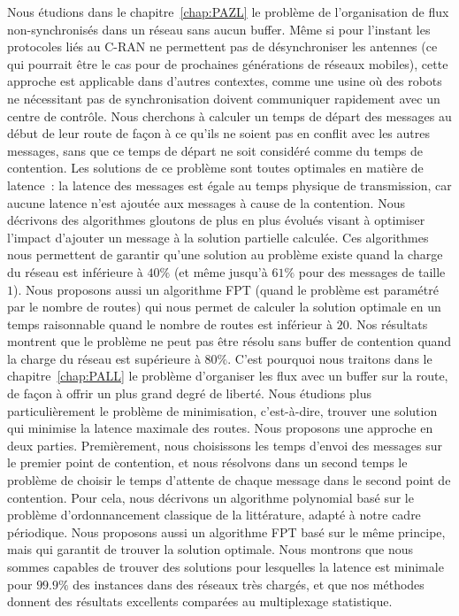 Nous étudions dans le chapitre~\ref{chap:PAZL} le problème de l'organisation de flux non-synchronisés dans un réseau sans aucun buffer.
Même si pour l'instant les protocoles liés au C-RAN ne permettent pas de désynchroniser les antennes (ce qui pourrait être le cas pour de prochaines générations de réseaux mobiles), cette approche est applicable dans d'autres contextes, comme une usine où des robots ne nécessitant pas de synchronisation doivent communiquer rapidement avec un centre de contrôle.
Nous cherchons à calculer un temps de départ des messages au début de leur route de façon à ce qu'ils ne soient pas en conflit avec les autres messages, sans que ce temps de départ ne soit considéré comme du temps de contention.
Les solutions de ce problème sont toutes optimales en matière de latence : la latence des messages est égale au temps physique de transmission, car aucune latence n'est ajoutée aux messages à cause de la contention. Nous décrivons des algorithmes gloutons de plus en plus évolués visant à optimiser l'impact d'ajouter un message à la solution partielle calculée. Ces algorithmes nous permettent de garantir qu'une solution au problème existe quand la charge du réseau est inférieure à $40\%$ (et même jusqu'à $61\%$ pour des messages de taille $1$). Nous proposons aussi un algorithme FPT (quand le problème est paramétré par le nombre de routes) qui nous permet de calculer la solution optimale en un temps raisonnable quand le nombre de routes est inférieur à $20$. Nos résultats montrent que le problème ne peut pas être résolu sans buffer de contention quand la charge du réseau est supérieure à $80\%$.
C'est pourquoi nous traitons dans le chapitre~\ref{chap:PALL} le problème d'organiser les flux avec un buffer sur la route, de façon à offrir un plus grand degré de liberté. Nous étudions plus particulièrement le problème de minimisation, c'est-à-dire, trouver une solution qui minimise la latence maximale des routes. Nous proposons une approche en deux parties. Premièrement, nous choisissons les temps d'envoi des messages sur le premier point de contention, et nous résolvons dans un second temps le problème de choisir le temps d'attente de chaque message dans le second point de contention. Pour cela, nous décrivons un algorithme polynomial basé sur le problème d'ordonnancement classique de la littérature, adapté à notre cadre périodique. Nous proposons aussi un algorithme FPT basé sur le même principe, mais qui garantit de trouver la solution optimale. Nous montrons que nous sommes capables de trouver des solutions pour lesquelles la latence est minimale pour $99.9\%$ des instances dans des réseaux très chargés, et que nos méthodes donnent des résultats excellents comparées au multiplexage statistique.

